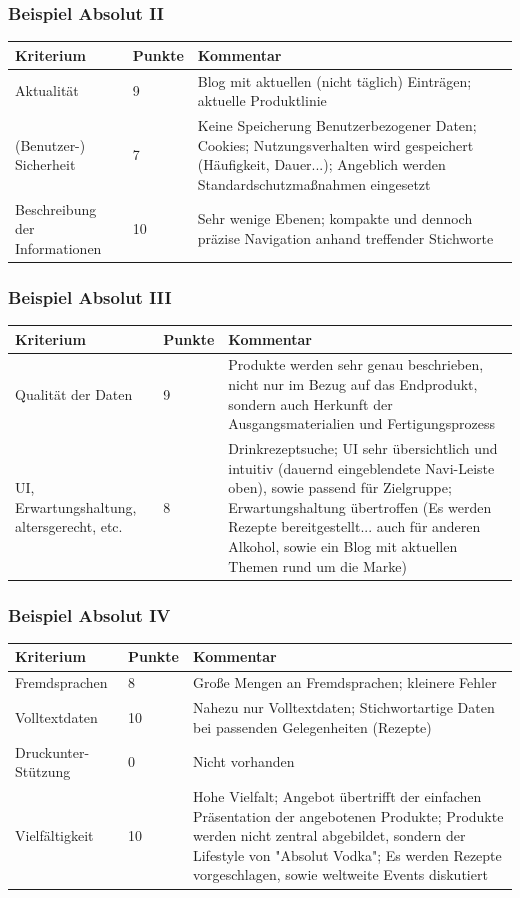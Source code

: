\begin{frame}
	\frametitle{Beispiel Absolut II}
	\begin{tabular}{|p{}|l|p{6cm}|}
	\hline
	  Kriterium & Punkte & Kommentar \\ \hline
  	  Aktualität & 9 & Blog mit aktuellen (nicht täglich) Einträgen; aktuelle Produktlinie \\ \hline
	  (Benutzer-) Sicherheit & 7 & Keine Speicherung Benutzerbezogener Daten; Cookies; Nutzungsverhalten wird gespeichert (Häufigkeit, Dauer...); Angeblich werden Standardschutzmaßnahmen eingesetzt \\ \hline
	  Beschreibung der Informationen & 10 & Sehr wenige Ebenen; kompakte und dennoch präzise Navigation anhand treffender Stichworte \\ \hline
 	\end{tabular}
\end{frame}

\begin{frame}
	\frametitle{Beispiel Absolut III}
	\begin{tabular}{|p{}|l|p{6cm}|}
	\hline
	  Kriterium & Punkte & Kommentar \\ \hline
	  Qualität der Daten & 9 & Produkte werden sehr genau beschrieben, nicht nur im Bezug auf das Endprodukt, sondern auch Herkunft der Ausgangsmaterialien und Fertigungsprozess \\ \hline
	  UI, Erwartungshaltung, altersgerecht, etc. & 8 & Drinkrezeptsuche; UI sehr übersichtlich und intuitiv (dauernd eingeblendete Navi-Leiste oben), sowie passend für Zielgruppe; Erwartungshaltung übertroffen (Es werden Rezepte bereitgestellt... auch für anderen Alkohol, sowie ein Blog mit aktuellen Themen rund um die Marke) \\ \hline
 	\end{tabular}
\end{frame}

\begin{frame}
	\frametitle{Beispiel Absolut IV}
	\begin{tabular}{|p{}|l|p{6cm}|}
	\hline
	  Kriterium & Punkte & Kommentar \\ \hline
	  Fremdsprachen & 8 & Große Mengen an Fremdsprachen; kleinere Fehler \\ \hline
	  Volltextdaten & 10 & Nahezu nur Volltextdaten; Stichwortartige Daten bei passenden Gelegenheiten (Rezepte) \\ \hline
	  Druckunter- Stützung & 0 & Nicht vorhanden \\ \hline
	  Vielfältigkeit & 10 & Hohe Vielfalt; Angebot übertrifft der einfachen Präsentation der angebotenen Produkte; Produkte werden nicht zentral abgebildet, sondern der Lifestyle von "Absolut Vodka"; Es werden Rezepte vorgeschlagen, sowie weltweite Events diskutiert \\ \hline
 	\end{tabular}
\end{frame}

